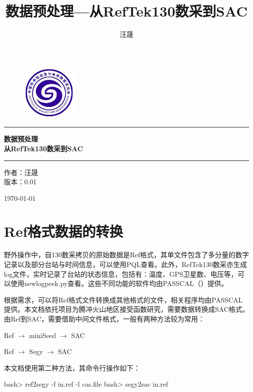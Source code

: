 \documentclass[a4paper]{article}
\title{数据预处理{---从Ref\mbox{}Tek130数采到SAC}}
\author{汪晟}
\begin{document}
\begin{titlepage}
\begin{center}
\begin{figure}[ht!]
\centering
\vspace{4cm}
\includegraphics[width=0.25\textwidth]{./logo.JPG}
\end{figure}
\hrule
\vspace{0.4cm}
{\Huge \bfseries 数据预处理     }\\[0.5cm]
{\Large \bfseries {从Ref\mbox{}Tek130数采到SAC}}\\[1cm]
\hrule
\vspace{1cm}
\textsc{\large  作者：汪晟}\\[0.5cm]
\textsc{\large  版本：0.01}

\vfill
{\large \today}
\end{center}
\end{titlepage}

\tableofcontents

\clearpage\section{Ref格式数据的转换}
野外操作中，自130数采拷贝的原始数据是Ref格式，其单文件包含了多分量的数字记录以及部分台站与时间信息，可以使用PQL查看。此外，RefTek130数采亦生成log文件，实时记录了台站的状态信息，包括有：温度、GPS卫星数、电压等，可以使用newlogpeek.py查看。这些不同功能的软件均由PASSCAL（）提供。\par
根据需求，可以将Ref格式文件转换成其他格式的文件，相关程序均由PASSCAL提供。本文档依托项目为腾冲火山地区接受函数研究，需要数据转换成SAC格式。由Ref到SAC，需要借助中间文件格式，一般有两种方法较为常用：\par
\begin{center}
Ref $\to$ miniSeed $\to$ SAC\par
Ref $\to$ Segy     $\to$ SAC\par
\end{center}

本文档使用第二种方法，其命令行操作如下：\par
\begin{bashCode}
bash> ref2segy -f in.ref -l cas.file
bash> segy2sac in.ref					
\end{bashCode}
\end{document}
